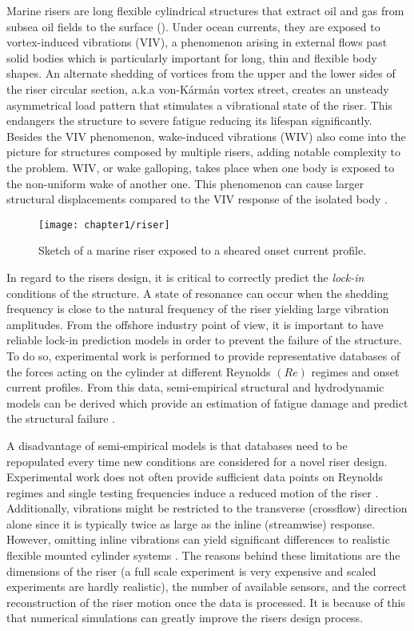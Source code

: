 \documentclass[../main.tex]{subfiles}
\begin{document}
Marine risers are long flexible cylindrical structures that extract oil and gas from subsea oil fields to the surface ().
Under ocean currents, they are exposed to vortex-induced vibrations (VIV), a phenomenon arising in external flows past solid bodies which is particularly important for long, thin and flexible body shapes.
An alternate shedding of vortices from the upper and the lower sides of the riser circular section, a.k.a von-K\'{a}rm\'{a}n vortex street, creates an unsteady asymmetrical load pattern that stimulates a vibrational state of the riser.
This endangers the structure to severe fatigue reducing its lifespan significantly.
Besides the VIV phenomenon, wake-induced vibrations (WIV) also come into the picture for structures composed by multiple risers, adding notable complexity to the problem.
WIV, or wake galloping, takes place when one body is exposed to the non-uniform wake of another one.
This phenomenon can cause larger structural displacements compared to the VIV response of the isolated body \citep{Assi2014}.

\begin{figure}[t]
\centering
\texttt{[image: chapter1/riser]}
\caption{Sketch of a marine riser exposed to a sheared onset current profile.}
\label{fig:riser}
\end{figure}

In regard to the risers design, it is critical to correctly predict the \textit{lock-in} conditions of the structure.
A state of resonance can occur when the shedding frequency is close to the natural frequency of the riser yielding large vibration amplitudes.
From the offshore industry point of view, it is important to have reliable lock-in prediction models in order to prevent the failure of the structure.
To do so, experimental work is performed to provide representative databases of the forces acting on the cylinder at different Reynolds $(Re)$ regimes and onset current profiles.
From this data, semi-empirical structural and hydrodynamic models can be derived which provide an estimation of fatigue damage and predict the structural failure \citep{Mukundan2008}.

A disadvantage of semi-empirical models is that databases need to be repopulated every time new conditions are considered for a novel riser design.
Experimental work does not often provide sufficient data points on Reynolds regimes and single testing frequencies induce a reduced motion of the riser \citep{Mukundan2008}.
Additionally, vibrations might be restricted to the transverse (crossflow) direction alone since it is typically twice as large as the inline (streamwise) response.
However, omitting inline vibrations can yield significant differences to realistic flexible mounted cylinder systems \citep{Dahl2007}.
The reasons behind these limitations are the dimensions of the riser (a full scale experiment is very expensive and scaled experiments are hardly realistic), the number of available sensors, and the correct reconstruction of the riser motion once the data is processed.
It is because of this that numerical simulations can greatly improve the risers design process.
\end{document}
